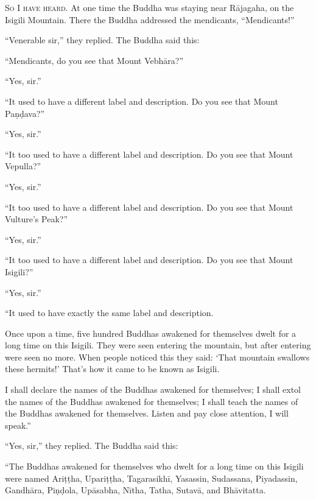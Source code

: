 \documentclass[12pt,openany]{book}%
\newcommand*{\scevam}[1]{\textsc{#1}}
\begin{document}
\scevam{So I have heard. }At one time the Buddha was staying near \textsanskrit{Rājagaha}, on the Isigili Mountain. There the Buddha addressed the mendicants, “Mendicants!” 

“Venerable sir,” they replied. The Buddha said this: 

“Mendicants, do you see that Mount \textsanskrit{Vebhāra}?” 

“Yes, sir.” 

“It used to have a different label and description. Do you see that Mount \textsanskrit{Paṇḍava}?” 

“Yes, sir.” 

“It too used to have a different label and description. Do you see that Mount Vepulla?” 

“Yes, sir.” 

“It too used to have a different label and description. Do you see that Mount Vulture’s Peak?” 

“Yes, sir.” 

“It too used to have a different label and description. Do you see that Mount Isigili?” 

“Yes, sir.” 

“It used to have exactly the same label and description. 

Once upon a time, five hundred Buddhas awakened for themselves dwelt for a long time on this Isigili. They were seen entering the mountain, but after entering were seen no more. When people noticed this they said: ‘That mountain swallows these hermits!’ That’s how it came to be known as Isigili. 

I shall declare the names of the Buddhas awakened for themselves; I shall extol the names of the Buddhas awakened for themselves; I shall teach the names of the Buddhas awakened for themselves. Listen and pay close attention, I will speak.” 

“Yes, sir,” they replied. The Buddha said this: 

“The Buddhas awakened for themselves who dwelt for a long time on this Isigili were named \textsanskrit{Ariṭṭha}, \textsanskrit{Upariṭṭha}, \textsanskrit{Tagarasikhī}, Yasassin, Sudassana, Piyadassin, \textsanskrit{Gandhāra}, \textsanskrit{Piṇḍola}, \textsanskrit{Upāsabha}, \textsanskrit{Nītha}, Tatha, \textsanskrit{Sutavā}, and \textsanskrit{Bhāvitatta}. 
\end{document}
